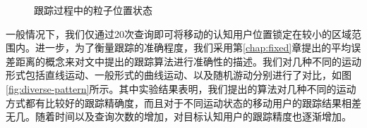 \begin{figure}
\hfill
{}
\caption{跟踪过程中的粒子位置状态}\label{fig:particles}
\end{figure}

一般情况下，我们仅通过20次查询即可将移动的认知用户位置锁定在较小的区域范围内。进一步，为了衡量跟踪的准确程度，我们采用第\ref{chap:fixed}章提出的平均误差距离的概念来对文中提出的跟踪算法进行准确性的描述。我们对几种不同的运动形式包括直线运动、一般形式的曲线运动、以及随机游动分别进行了对比，如图\ref{fig:diverse-pattern}所示。其中实验结果表明，我们提出的算法对几种不同的运动方式都有比较好的跟踪精确度，而且对于不同运动状态的移动用户的跟踪结果相差无几。随着时间以及查询次数的增加，对目标认知用户的跟踪精度也逐渐增加。

